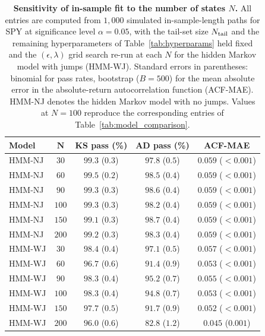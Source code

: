 \begin{table}[tbp]
\centering
\caption{\textbf{Sensitivity of in-sample fit to the number of
    states $N$.} All entries are computed from $1{,}000$ simulated
    in-sample-length paths for SPY at significance level
    $\alpha = 0.05$, with the tail-set size $N_{\rm tail}$ and the
    remaining hyperparameters of Table~\ref{tab:hyperparams} held
    fixed and the $(\epsilon, \lambda)$ grid search re-run at each
    $N$ for the hidden Markov model with jumps (HMM-WJ). Standard
    errors in parentheses: binomial for pass rates, bootstrap
    ($B = 500$) for the mean absolute error in the absolute-return
    autocorrelation function (ACF-MAE). HMM-NJ denotes the hidden
    Markov model with no jumps. Values at $N = 100$ reproduce the
    corresponding entries of Table~\ref{tab:model_comparison}.}
\label{tab:sensitivity_n}
\small
\begin{tabular}{@{}lcccc@{}}
\toprule
\textbf{Model} & $\boldsymbol{N}$ & \textbf{KS pass (\%)} &
  \textbf{AD pass (\%)} & \textbf{ACF-MAE} \\ \midrule
HMM-NJ & $30$  & $99.3$ ($0.3$) & $97.8$ ($0.5$) & $0.059$ ($<\!0.001$) \\
HMM-NJ & $60$  & $99.5$ ($0.2$) & $98.5$ ($0.4$) & $0.059$ ($<\!0.001$) \\
HMM-NJ & $90$  & $99.3$ ($0.3$) & $98.6$ ($0.4$) & $0.059$ ($<\!0.001$) \\
HMM-NJ & $100$ & $99.3$ ($0.3$) & $98.2$ ($0.4$) & $0.059$ ($<\!0.001$) \\
HMM-NJ & $150$ & $99.1$ ($0.3$) & $98.7$ ($0.4$) & $0.059$ ($<\!0.001$) \\
HMM-NJ & $200$ & $99.2$ ($0.3$) & $98.3$ ($0.4$) & $0.059$ ($<\!0.001$) \\ \midrule
HMM-WJ & $30$  & $98.4$ ($0.4$) & $97.1$ ($0.5$) & $0.057$ ($<\!0.001$) \\
HMM-WJ & $60$  & $96.7$ ($0.6$) & $91.4$ ($0.9$) & $0.053$ ($<\!0.001$) \\
HMM-WJ & $90$  & $98.3$ ($0.4$) & $95.2$ ($0.7$) & $0.055$ ($<\!0.001$) \\
HMM-WJ & $100$ & $98.3$ ($0.4$) & $94.8$ ($0.7$) & $0.053$ ($<\!0.001$) \\
HMM-WJ & $150$ & $97.7$ ($0.5$) & $91.7$ ($0.9$) & $0.052$ ($<\!0.001$) \\
HMM-WJ & $200$ & $96.0$ ($0.6$) & $82.8$ ($1.2$) & $0.045$ ($0.001$) \\
\bottomrule
\end{tabular}
\end{table}


